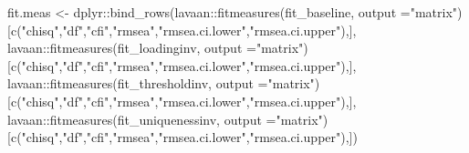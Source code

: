 \documentclass[
  12pt,
]{article}
\newenvironment{Shaded}{\begin{snugshade}}{\end{snugshade}}
\newcommand{\AttributeTok}[1]{\textcolor[rgb]{0.40,0.45,0.13}{#1}}
\newcommand{\FunctionTok}[1]{\textcolor[rgb]{0.28,0.35,0.67}{#1}}
\newcommand{\NormalTok}[1]{\textcolor[rgb]{0.00,0.23,0.31}{#1}}
\newcommand{\OtherTok}[1]{\textcolor[rgb]{0.00,0.23,0.31}{#1}}
\newcommand{\SpecialCharTok}[1]{\textcolor[rgb]{0.37,0.37,0.37}{#1}}
\newcommand{\StringTok}[1]{\textcolor[rgb]{0.13,0.47,0.30}{#1}}
\begin{document}
\begin{Shaded}
\begin{Highlighting}[]
\NormalTok{fit.meas }\OtherTok{\textless{}{-}}\NormalTok{ dplyr}\SpecialCharTok{::}\FunctionTok{bind\_rows}\NormalTok{(lavaan}\SpecialCharTok{::}\FunctionTok{fitmeasures}\NormalTok{(fit\_baseline, }\AttributeTok{output =}\StringTok{"matrix"}\NormalTok{)[}\FunctionTok{c}\NormalTok{(}\StringTok{"chisq"}\NormalTok{,}\StringTok{"df"}\NormalTok{,}\StringTok{"cfi"}\NormalTok{,}\StringTok{"rmsea"}\NormalTok{,}\StringTok{"rmsea.ci.lower"}\NormalTok{,}\StringTok{"rmsea.ci.upper"}\NormalTok{),],}
\NormalTok{                             lavaan}\SpecialCharTok{::}\FunctionTok{fitmeasures}\NormalTok{(fit\_loadinginv,  }\AttributeTok{output =}\StringTok{"matrix"}\NormalTok{)[}\FunctionTok{c}\NormalTok{(}\StringTok{"chisq"}\NormalTok{,}\StringTok{"df"}\NormalTok{,}\StringTok{"cfi"}\NormalTok{,}\StringTok{"rmsea"}\NormalTok{,}\StringTok{"rmsea.ci.lower"}\NormalTok{,}\StringTok{"rmsea.ci.upper"}\NormalTok{),],}
\NormalTok{                             lavaan}\SpecialCharTok{::}\FunctionTok{fitmeasures}\NormalTok{(fit\_thresholdinv, }\AttributeTok{output =}\StringTok{"matrix"}\NormalTok{)[}\FunctionTok{c}\NormalTok{(}\StringTok{"chisq"}\NormalTok{,}\StringTok{"df"}\NormalTok{,}\StringTok{"cfi"}\NormalTok{,}\StringTok{"rmsea"}\NormalTok{,}\StringTok{"rmsea.ci.lower"}\NormalTok{,}\StringTok{"rmsea.ci.upper"}\NormalTok{),],}
\NormalTok{                             lavaan}\SpecialCharTok{::}\FunctionTok{fitmeasures}\NormalTok{(fit\_uniquenessinv, }\AttributeTok{output =}\StringTok{"matrix"}\NormalTok{)[}\FunctionTok{c}\NormalTok{(}\StringTok{"chisq"}\NormalTok{,}\StringTok{"df"}\NormalTok{,}\StringTok{"cfi"}\NormalTok{,}\StringTok{"rmsea"}\NormalTok{,}\StringTok{"rmsea.ci.lower"}\NormalTok{,}\StringTok{"rmsea.ci.upper"}\NormalTok{),])}


\end{Highlighting}
\end{Shaded}
\end{document}
